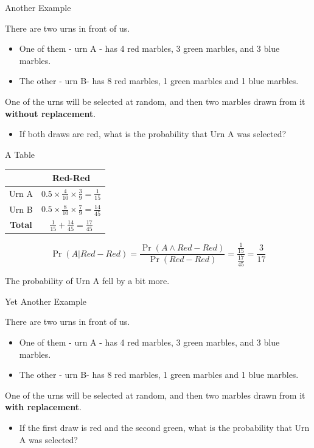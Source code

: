 \documentclass[
  ignorenonframetext,
]{beamer}
\providecommand{\tightlist}{%
  \setlength{\itemsep}{0pt}\setlength{\parskip}{0pt}}
\renewcommand{\,}{\text{, }}
\begin{document}
\begin{frame}{Another Example}
\protect\hypertarget{another-example-2}{}

There are two urns in front of us.

\begin{itemize}
\tightlist
\item
  One of them - urn A - has 4 red marbles, 3 green marbles, and 3 blue
  marbles.
\item
  The other - urn B- has 8 red marbles, 1 green marbles and 1 blue
  marbles. \pause
\end{itemize}

One of the urns will be selected at random, and then two marbles drawn
from it \textbf{without replacement}.

\begin{itemize}
\tightlist
\item
  If both draws are red, what is the probability that Urn A was
  selected?
\end{itemize}

\end{frame}

\begin{frame}{A Table}
\protect\hypertarget{a-table-3}{}

\begin{longtable}[]{@{}cc@{}}
\toprule
& Red-Red\tabularnewline
\midrule
\endhead
Urn A &
\(0.5 \times \frac{4}{10} \times \frac{3}{9} = \frac{1}{15}\)\tabularnewline
Urn B &
\(0.5 \times \frac{8}{10} \times \frac{7}{9} = \frac{14}{45}\)\tabularnewline
\textbf{Total} &
\(\frac{1}{15} + \frac{14}{45} = \frac{17}{45}\)\tabularnewline
\bottomrule
\end{longtable}

\pause

\[
\Pr(A | Red-Red) = \frac{\Pr(A \wedge Red-Red)}{\Pr(Red-Red)} = \frac{\frac{1}{15}}{\frac{17}{45}} = \frac{3}{17}
\]

The probability of Urn A fell by a bit more.

\end{frame}

\begin{frame}{Yet Another Example}
\protect\hypertarget{yet-another-example-1}{}

There are two urns in front of us.

\begin{itemize}
\tightlist
\item
  One of them - urn A - has 4 red marbles, 3 green marbles, and 3 blue
  marbles.
\item
  The other - urn B- has 8 red marbles, 1 green marbles and 1 blue
  marbles. \pause
\end{itemize}

One of the urns will be selected at random, and then two marbles drawn
from it \textbf{with replacement}.

\begin{itemize}
\tightlist
\item
  If the first draw is red and the second green, what is the probability
  that Urn A was selected?
\end{itemize}

\end{frame}
\end{document}

